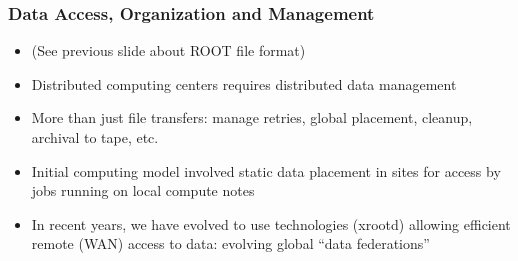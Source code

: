 \begin{frame}
\frametitle{Data Access, Organization and Management}

\begin{itemize}
\item (See previous slide about ROOT file format)
\item Distributed computing centers requires distributed data management
\item More than just file transfers: manage retries, global placement, cleanup, archival to tape, etc.
\item Initial computing model involved static data placement in sites for access by jobs running on local compute notes
\item In recent years, we have evolved to use technologies (xrootd) allowing efficient remote (WAN) access to data: evolving global ``data federations''
\end{itemize}

\end{frame}


